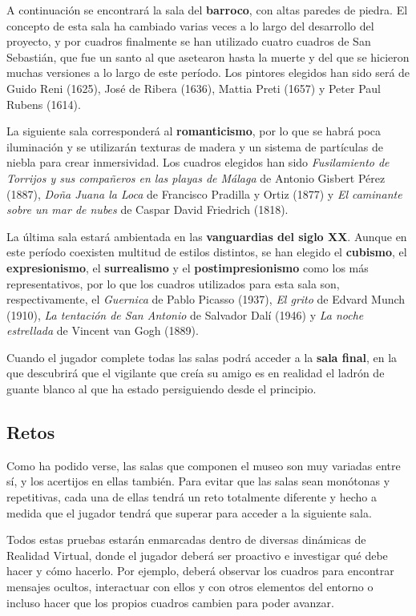 A continuación se encontrará la sala del \textbf{barroco}, con altas paredes de piedra. El concepto de esta sala ha cambiado varias veces a lo largo del desarrollo del proyecto, y por cuadros finalmente se han utilizado cuatro cuadros de San Sebastián, que fue un santo al que asetearon hasta la muerte y del que se hicieron muchas versiones a lo largo de este período. Los pintores elegidos han sido será de Guido Reni (1625),  José de Ribera (1636), Mattia Preti (1657) y Peter Paul Rubens (1614).

La siguiente sala corresponderá al \textbf{romanticismo}, por lo que se habrá poca iluminación y se utilizarán texturas de madera y un sistema de partículas de niebla para crear inmersividad. Los cuadros elegidos han sido \textit{Fusilamiento de Torrijos y sus compañeros en las playas de Málaga} de Antonio Gisbert Pérez (1887), \textit{Doña Juana la Loca} de Francisco Pradilla y Ortiz (1877) y \textit{El caminante sobre un mar de nubes} de Caspar David Friedrich (1818).

La última sala estará ambientada en las \textbf{vanguardias del siglo XX}. Aunque en este período coexisten multitud de estilos distintos, se han elegido el \textbf{cubismo}, el \textbf{expresionismo}, el \textbf{surrealismo} y el \textbf{postimpresionismo} como los más representativos, por lo que los cuadros utilizados para esta sala son, respectivamente, el \textit{Guernica} de Pablo Picasso (1937), \textit{El grito} de Edvard Munch (1910), \textit{La tentación de San Antonio} de Salvador Dalí (1946) y \textit{La noche estrellada} de Vincent van Gogh (1889).

Cuando el jugador complete todas las salas podrá acceder a la \textbf{sala final}, en la que descubrirá que el vigilante que creía su amigo es en realidad el ladrón de guante blanco al que ha estado persiguiendo desde el principio.

\subsection{Retos}

Como ha podido verse, las salas que componen el museo son muy variadas entre sí, y los acertijos en ellas también. Para evitar que las salas sean monótonas y repetitivas, cada una de ellas tendrá un reto totalmente diferente y hecho a medida que el jugador tendrá que superar para acceder a la siguiente sala. 

Todos estas pruebas estarán enmarcadas dentro de diversas dinámicas de Realidad Virtual, donde el jugador deberá ser proactivo e investigar qué debe hacer y cómo hacerlo. Por ejemplo, deberá observar los cuadros para encontrar mensajes ocultos, interactuar con ellos y con otros elementos del entorno o incluso hacer que los propios cuadros cambien para poder avanzar.